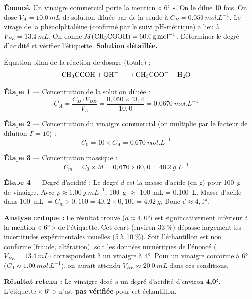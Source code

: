 \documentclass[11pt]{article}
\begin{document}
\begin{exoresolu}
\textbf{Énoncé.} Un vinaigre commercial porte la mention « 6° ». On le dilue 10 fois. On dose $V_A = \SI{10,0}{mL}$ de solution diluée par de la soude à $C_B = \SI{0,050}{mol.L^{-1}}$. Le virage de la phénolphtaléine (confirmé par le suivi pH-métrique) a lieu à $V_{BE} = \SI{13,4}{mL}$. On donne $M(\ce{CH3COOH}) = \SI{60,0}{g.mol^{-1}}$. Déterminer le degré d'acidité et vérifier l'étiquette.
\tcblower
\textbf{Solution détaillée.}

Équation-bilan de la réaction de dosage (totale) :
\[ \ce{CH3COOH + OH- -> CH3COO- + H2O} \]

\textbf{Étape 1} — Concentration de la solution diluée :
\[ C_A = \frac{C_B \cdot V_{BE}}{V_A} = \frac{0,050 \times 13,4}{10,0} = \SI{0,0670}{mol.L^{-1}} \]

\textbf{Étape 2} — Concentration du vinaigre commercial (on multiplie par le facteur de dilution $F=10$) :
\[ C_0 = 10 \times C_A = \SI{0,670}{mol.L^{-1}} \]

\textbf{Étape 3} — Concentration massique :
\[ C_m = C_0 \times M = 0,670 \times 60,0 = \SI{40,2}{g.L^{-1}} \]

\textbf{Étape 4} — Degré d'acidité :
Le degré $d$ est la masse d'acide (en g) pour \SI{100}{g} de vinaigre. Avec $\rho \approx \SI{1,00}{g.mL^{-1}}$, \SI{100}{g} $\approx$ \SI{100}{mL} = \SI{0,100}{L}.
Masse d'acide dans \SI{100}{mL} $= C_m \times 0,100 = 40,2 \times 0,100 = \SI{4,02}{g}$.
Donc $d \approx 4,0°$.

\textbf{Analyse critique :} Le résultat trouvé ($d \approx 4,0°$) est significativement inférieur à la mention « 6° » de l'étiquette. Cet écart (environ 33 \%) dépasse largement les incertitudes expérimentales usuelles (5 à 10 \%). Soit l'échantillon est non conforme (fraude, altération), soit les données numériques de l'énoncé ($V_{BE} = \SI{13,4}{mL}$) correspondent à un vinaigre à 4°. Pour un vinaigre conforme à 6° ($C_0 \approx \SI{1,00}{mol.L^{-1}}$), on aurait attendu $V_{BE} \approx \SI{20,0}{mL}$ dans ces conditions.

\textbf{Résultat retenu :} Le vinaigre dosé a un degré d'acidité d'environ \textbf{4,0°}. L'étiquette « 6° » n'est \textbf{pas vérifiée} pour cet échantillon.
\end{exoresolu}
\end{document}
